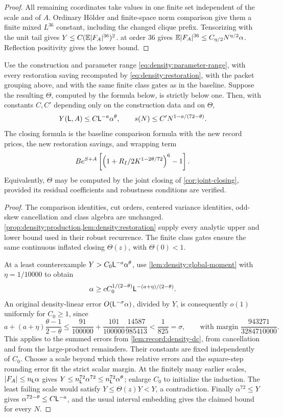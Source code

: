 \begin{proof}
All remaining coordinates take values in one finite set independent of the scale and of $A$. Ordinary
H\"older and finite-space norm comparison give them a finite mixed
$L^{36}$ constant, including the changed clique prefix. Tensorizing
with the unit tail gives $Y\le C(\mathbb E|F_A|^{36})^2$.
 at order $36$ gives
$\mathbb E|F_A|^{36}\le C_{\eta/2}N^{\eta/2}\alpha$.
Reflection positivity gives the lower bound.
\end{proof}

\begin{theorem}\label{thm:density:induction}
Use the construction and parameter range
\eqref{eq:density:parameter-range}, with every restoration saving
recomputed by \eqref{eq:density:restoration}, with the packet
grouping above, and with the same finite class gates as in the
baseline. Suppose the resulting $\Theta$, computed by the formula below, is strictly below one. Then, with constants $C,C'$ depending only on the construction data and on $\Theta$,
\[
 Y(\mathsf L,A)\le C\mathsf L^{-a}\alpha^\theta,
 \qquad s(N)\le C'N^{1-a/(72-\theta)}.
\]
The closing formula is the baseline comparison formula with the new
record prices, the new restoration savings, and wrapping term
\[
 B e^{S+A}\left[
 \left(1+R_I/2K^{1-2\theta/72}\right)^6-1\right].
\]
Equivalently, $\Theta$ may be computed by the joint closing of
\cref{cor:joint-closing},
provided its residual coefficients and robustness conditions are verified.
\end{theorem}

\begin{proof}
The comparison identities, cut orders, centered variance identities,
odd-skew cancellation and class algebra are unchanged.
\cref{prop:density:production,lem:density:restoration} supply every
analytic upper and lower bound used in their robust recurrence.
The finite class gates ensure the same continuous inflated closing
$\Theta(z)$, with $\Theta(0)<1$.

At a least counterexample $Y>C_0\mathsf L^{-a}\alpha^\theta$, use
\cref{lem:density:global-moment} with $\eta=1/10000$ to obtain
\[
 \alpha\ge c C_0^{1/(2-\theta)}
       \mathsf L^{-(a+\eta)/(2-\theta)}.
\]
An original density-linear error $O(\mathsf L^{-\sigma}\alpha)$, divided
by $Y$, is consequently $o(1)$ uniformly for $C_0\ge1$, since
\[
 a+(a+\eta)\frac{\theta-1}{2-\theta}
 \le\frac{91}{100000}+\frac{101}{100000}\frac{14587}{985413}
 <\frac1{825}=\sigma,
 \qquad \text{with margin }\frac{943271}{3284710000}.
\]
This applies to the summed errors from
\cref{lem:record:density-dc}, from cancellation and from the
large-product remainders. Their constants are fixed independently of
$C_0$. Choose a scale beyond which these relative errors and the
square-step rounding error fit the strict scalar margin.
At the finitely many earlier scales, $|F_A|\le n_\mathsf L\alpha$ gives
$Y\le n_\mathsf L^{72}\alpha^{72}\le n_\mathsf L^{72}\alpha^\theta$;
enlarge $C_0$ to initialize the induction. The least failing scale
would satisfy $Y\le\Theta(z)Y<Y$, a contradiction.
Finally $\alpha^{72}\le Y$ gives
$\alpha^{72-\theta}\le C\mathsf L^{-a}$, and the usual interval embedding
gives the claimed bound for every $N$.
\end{proof}
